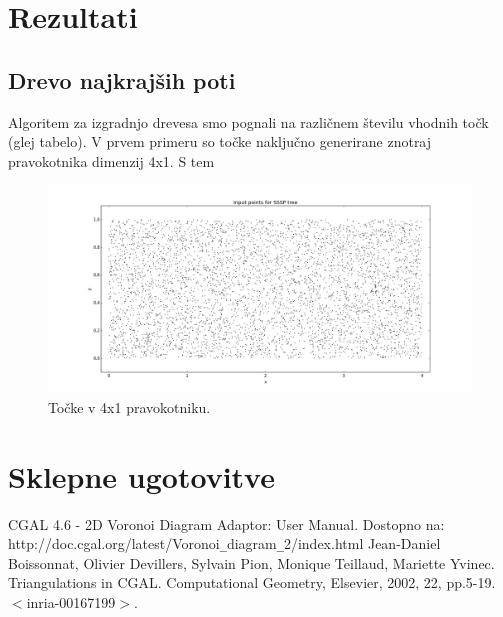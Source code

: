 \documentclass[a4paper, 12pt]{book}
\begin{document}






\chapter{Rezultati}
\label{ch3}
\section{Drevo najkrajših poti}
Algoritem za izgradnjo drevesa smo pognali na različnem številu vhodnih točk (glej tabelo). V prvem primeru so točke naključno generirane znotraj pravokotnika dimenzij 4x1. S tem 
\begin{figure}
\centerline{\includegraphics[scale=0.3]{pics/w_points5000-1.png}}
\caption{Točke v 4x1 pravokotniku.}
\label{adsr}
\end{figure}


\chapter{Sklepne ugotovitve}
\label{ch4}

\begin{thebibliography}{99}
CGAL 4.6 - 2D Voronoi Diagram Adaptor: User Manual. Dostopno na:\\ http://doc.cgal.org/latest/Voronoi\texttt{\_}diagram\texttt{\_}2/index.html
Jean-Daniel Boissonnat, Olivier Devillers, Sylvain Pion, Monique Teillaud, Mariette Yvinec.
Triangulations in CGAL. Computational Geometry, Elsevier, 2002, 22, pp.5-19. $<$inria-00167199$>$.

\end{thebibliography}
\end{document}
